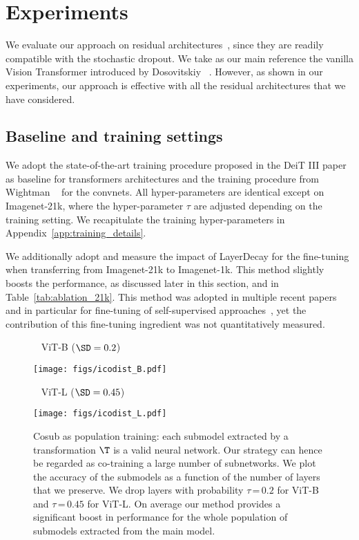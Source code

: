 \section{Experiments}

We evaluate our approach on residual architectures~\cite{He2016ResNet,He2016IdentityMappings}, since they are readily compatible with the stochastic dropout.  We take as our main reference the vanilla Vision Transformer introduced by Dosovitskiy \etal~\cite{dosovitskiy2020image}. 
However, as shown  in our experiments, our approach is effective with all the residual architectures that we have considered. 


\subsection{Baseline and training settings}

We adopt the state-of-the-art training procedure proposed in the DeiT III paper~\cite{touvron2022deitIII} as baseline for transformers architectures and the training procedure from Wightman \etal~\cite{wightman2021resnet} for the convnets. 
All hyper-parameters are identical except on Imagenet-21k, where the hyper-parameter $\tau$ are adjusted depending on the training setting. We recapitulate the training hyper-parameters in Appendix~\ref{app:training_details}. 

 We additionally adopt and measure the impact of LayerDecay for the fine-tuning when transferring from Imagenet-21k to Imagenet-1k. This method slightly boosts the performance, as discussed later in this section, and in Table~\ref{tab:ablation_21k}. This method was adopted in multiple recent papers and in particular for fine-tuning of self-supervised approaches~\cite{bao2021beit,He2021MaskedAA}, yet the contribution of this fine-tuning ingredient was not quantitatively measured.

\begin{figure}
\begin{minipage}{0.48 \linewidth}
~ \hfill \quad \small ViT-B ($\SD=0.2$) \hfill  ~
    
    \texttt{[image: figs/icodist\_B.pdf]}
    \end{minipage}
    \hfill
    \begin{minipage}{0.48 \linewidth}
    ~ \hfill \small ViT-L ($\SD=0.45$) \hfill  ~
    
    \texttt{[image: figs/icodist\_L.pdf]}
    \end{minipage}
    \vspace{-0.5em}
    \caption{Cosub as population training: each submodel extracted by a transformation $\T$ is a valid neural network. Our \ours strategy can hence be regarded as co-training a large number of subnetworks. We plot the accuracy of the submodels as a function of the number of layers that we preserve. 
    We drop layers with probability $\tau$\,=\,$0.2$ for ViT-B and $\tau$\,=\,$0.45$ for ViT-L.  
    On average our method provides a significant boost in performance for the whole population of submodels extracted from the main model. 
\label{fig:sub_mod}}
\end{figure}



